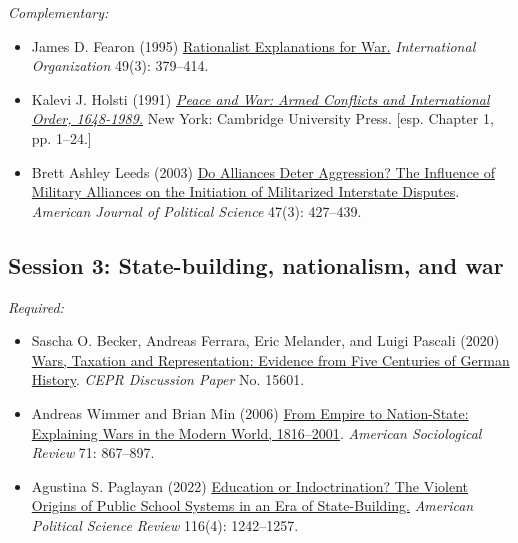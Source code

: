 \documentclass[12pt, a4paper]{article}
\begin{document}
\noindent\textit{Complementary:}

\begin{itemize}
  \item James D. Fearon (1995) \href{https://doi.org/10.1017/S0020818300033324}{Rationalist Explanations for War.} \textit{International Organization} 49(3): 379--414.
  \item Kalevi J. Holsti (1991) \href{https://www.cambridge.org/core/books/peace-and-war/37AEB58913E6EF0834D40EFE086D32FE}{\textit{Peace and War: Armed Conflicts and International Order, 1648-1989.}} New York: Cambridge University Press. [esp. Chapter 1, pp. 1--24.]
	\item Brett Ashley Leeds (2003) \href{https://doi.org/10.1111/1540-5907.00031}{Do Alliances Deter Aggression? The Influence of Military Alliances on the Initiation of Militarized Interstate Disputes}. \textit{American Journal of Political Science} 47(3): 427--439.
\end{itemize}

\vspace{20pt}
\hline
\subsection*{Session 3: State-building, nationalism, and war}

\noindent\textit{Required:}

\begin{itemize}
	\item Sascha O. Becker, Andreas Ferrara, Eric Melander, and Luigi Pascali (2020) \href{https://cepr.org/publications/dp15601}{Wars, Taxation and Representation: Evidence from Five Centuries of German History}. \textit{CEPR Discussion Paper} No. 15601.
	\item Andreas Wimmer and Brian Min (2006) \href{https://doi.org/10.1177/000312240607100601}{From Empire to Nation-State: Explaining Wars in the Modern World, 1816–2001}. \textit{American Sociological Review} 71: 867--897.
  \item Agustina S. Paglayan (2022) \href{https://doi.org/10.1017/S0003055422000247}{Education or Indoctrination? The Violent Origins of Public School Systems in an Era of State-Building.} \textit{American Political Science Review} 116(4): 1242--1257.
\end{itemize}
\end{document}
